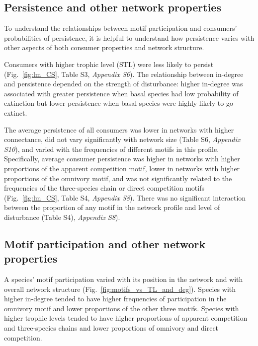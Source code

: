 \documentclass[12pt]{article}
\begin{document}
\begin{spacing}{2.0}
    \subsection*{Persistence and other network properties}

        To understand the relationships between motif participation and consumers' probabilities of persistence, it is helpful to understand how persistence varies with other aspects of both consumer properties and network structure.
        
        Consumers with higher trophic level (STL) were less likely to persist (Fig.~\ref{fig:lm_CS}, Table S3, \emph{Appendix S6}).
        The relationship between in-degree and persistence depended on the strength of disturbance: higher in-degree was associated with greater persistence when basal species had low probability of extinction but lower persistence when basal species were highly likely to go extinct.


        The average persistence of all consumers was lower in networks with higher connectance, did not vary significantly with network size (Table S6, \emph{Appendix S10}), and  varied with the frequencies of different motifs in this profile.
        Specifically, average consumer persistence was higher in networks with higher proportions of the apparent competition motif, lower in networks with higher proportions of the omnivory motif, and was not significantly related to the frequencies of the three-species chain or direct competition motifs (Fig.~\ref{fig:lm_CS}, Table S4, \emph{Appendix S8}). 
        There was no significant interaction between the proportion of any motif in the network profile and level of disturbance (Table S4), \emph{Appendix S8}).


    \subsection*{Motif participation and other network properties}


        A species' motif participation varied with its position in the network and with overall network structure (Fig.~\ref{fig:motifs_vs_TL_and_deg}).
        Species with higher in-degree tended to have higher frequencies of participation in the omnivory motif and lower proportions of the other three motifs.
        Species with higher trophic levels tended to have higher proportions of apparent competition and three-species chains and lower proportions of omnivory and direct competition. 
        

\end{spacing}
\end{document}
